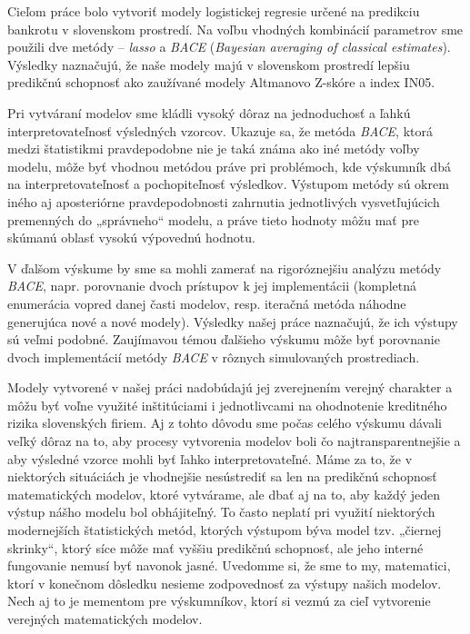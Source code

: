 Cieľom práce bolo vytvoriť modely logistickej regresie určené na predikciu bankrotu v slovenskom prostredí.
Na voľbu vhodných kombinácií parametrov sme použili dve metódy – \emph{lasso} a \emph{BACE} (\emph{Bayesian averaging of classical estimates}).
Výsledky naznačujú, že naše modely majú v slovenskom prostredí lepšiu predikčnú schopnosť ako zaužívané modely Altmanovo Z-skóre a index IN05.

Pri vytváraní modelov sme kládli vysoký dôraz na jednoduchosť a ľahkú interpretovateľnosť výsledných vzorcov.
Ukazuje sa, že metóda \emph{BACE}, ktorá medzi štatistikmi pravdepodobne nie je taká známa ako iné metódy voľby modelu,
môže byť vhodnou metódou práve pri problémoch, kde výskumník dbá na interpretovateľnosť a pochopiteľnosť výsledkov.
Výstupom metódy sú okrem iného aj aposteriórne pravdepodobnosti zahrnutia jednotlivých vysvetľujúcich premenných do „správneho“ modelu,
a práve tieto hodnoty môžu mať pre skúmanú oblasť vysokú výpovednú hodnotu.

V ďalšom výskume by sme sa mohli zamerať na rigoróznejšiu analýzu metódy \emph{BACE}, napr. porovnanie dvoch prístupov k jej implementácii
(kompletná enumerácia vopred danej časti modelov, resp. iteračná metóda náhodne generujúca nové a nové modely).
Výsledky našej práce naznačujú, že ich výstupy sú veľmi podobné.
Zaujímavou témou ďalšieho výskumu môže byť porovnanie dvoch implementácií metódy \emph{BACE} v rôznych simulovaných prostrediach.

Modely vytvorené v našej práci nadobúdajú jej zverejnením verejný charakter a môžu byť voľne využité inštitúciami i
jednotlivcami na ohodnotenie kreditného rizika slovenských firiem.
Aj z tohto dôvodu sme počas celého výskumu dávali veľký dôraz na to, aby procesy vytvorenia modelov boli čo najtransparentnejšie
a aby výsledné vzorce mohli byť ľahko interpretovateľné.
Máme za to, že v niektorých situáciách je vhodnejšie nesústrediť sa len na predikčnú schopnosť matematických modelov,
ktoré vytvárame, ale dbať aj na to, aby každý jeden výstup nášho modelu bol obhájiteľný.
To často neplatí pri využití niektorých modernejších štatistických metód, ktorých výstupom býva model tzv. „čiernej skrinky“,
ktorý síce môže mať vyššiu predikčnú schopnosť, ale jeho interné fungovanie nemusí byť navonok jasné.
Uvedomme si, že sme to my, matematici, ktorí v konečnom dôsledku nesieme zodpovednosť za výstupy našich modelov.
Nech aj to je mementom pre výskumníkov, ktorí si vezmú za cieľ vytvorenie verejných matematických modelov.